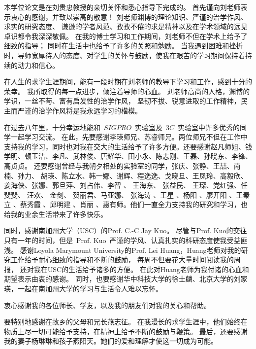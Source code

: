 \par 本学位论文是在刘贵忠教授的亲切关怀和悉心指导下完成的。 首先谨向刘老师表示衷心的感谢，并致以崇高的敬意！
刘老师渊博的理论知识、严谨的治学作风、求实的研究态度、
谦逊的学者风范、孜孜不倦的求是精神以及在学术领域的远见卓识都令我深深敬佩。
在我的博士学习和工作期间，刘老师不但在学术上给予了细致的指导； 同时在生活中也给予了许多的关照和勉励。
当我遇到困难和挫折时，导师宽厚待人的态度、对学生的关怀与鼓励，使我在艰苦的学习期间保持着持续的动力和信心。

在人生的求学生涯期间，能有一段时期在刘老师的教导下学习和工作，感到十分的荣幸。
我所取得的每一点进步，倾注着导师的心血。
刘老师高尚的人格，渊博的学识，一丝不苟、富有启发性的治学作风，
坚韧不拔、锐意进取的工作精神，民主而严谨的治学作风将是我永远学习的楷模。

\par 在过去八年里，十分幸运地能和~$SIGPRO$~实验室及~$3C$~实验室中许多优秀的同学一起学习交流。
在此，先要感谢李瑛师兄、苏睿师兄。两位师兄不但在工作中支持我的学习，同时也对我在交大的生活给予了许多方便。还要感谢赵凡师姐、钱学明、顿玉洁、李凡、武林俊、唐耀华、田小永、陈志刚、王磊、孙晓东、李锋、高贞贞。
还要感谢曾经与我朝夕相处的实验室的同学，张庆、张静、王喆、南楠、孙力、 胡瑛、陈立水、韩一娜、谢辉、程逸逸、戈晓旦、王凤玲、高毅欣、姜海侠、张娜、郭旦萍、刘占伟、李智 、 王海东、 张益民、 王琛、党红强、任斐斐、 汪欢、 金剑、 贺丽君、马亚娜、 张海涛 、王星 、杨阳 、廖开阳 、王秦立 、蔡秀霞 、邱明建 、肖丽 、惠有师。他们一直全力支持我的研究和学习，也给我的业余生活带来了许多快乐。

\par 同时，感谢南加州大学（USC）的Prof. C.-C Jay Kuo。
尽管与Prof. Kuo的交往只有一年的时间，但是~Prof. Kuo~严谨的学风、认真扎实的科研态度使我受益匪浅。
感谢Loyola Marymount University的Prof. Lei Huang，Huang老师对我的研究工作给予耐心细致的指导和不断的鼓励，
每周不但要花大量时间阅读我的周报，
还对我在USC的生活给予诸多的方便。
在此对Huang老师为我付诸的心血和期望表示由衷的感谢。
同时，也要感谢华中科技大学的徐士麟、北京大学的刘家瑛，一起在南加州大学的学习与生活令人难以忘怀。

\par 衷心感谢我的各位师长、学友，以及我的朋友们对我的关心和帮助。 
\par 要特别地感谢在故乡的父母和兄长燕志征。 在我漫长的求学生涯中，他们始终在物质上尽一切可能给予支持，在精神上给予不断的鼓励与鞭策。 最后，还要感谢我的妻子杨琳琳和孩子燕阳天。她们的爱和理解才使这一切成为可能。
